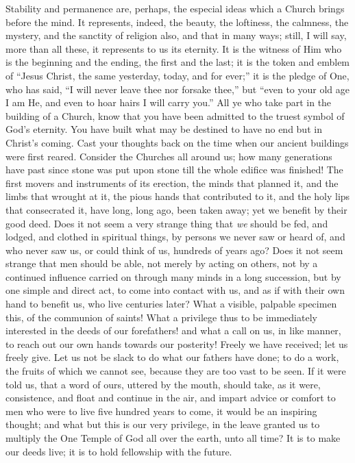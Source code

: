 Stability and permanence are, perhaps, the especial ideas which a
Church brings before the mind. It represents, indeed, the beauty, the
loftiness, the calmness, the mystery, and the sanctity of religion
also, and that in many ways; still, I will say, more than all these,
it represents to us its eternity. It is the witness of Him who is the
beginning and the ending, the first and the last; it is the token and
emblem of ``Jesus Christ, the same yesterday, today, and for
ever;'' it is the pledge of One, who has said, ``I will never
leave thee nor forsake thee,'' but ``even to your old age I am
He, and even to hoar hairs I will carry you.'' All ye who take
part in the building of a Church, know that you have been admitted to
the truest symbol of God's eternity. You have built what may be
destined to have no end but in Christ's coming. Cast your thoughts
back on the time when our ancient buildings were first reared.
Consider the Churches all around us; how many generations have past
since stone was put upon stone till the whole edifice was finished!
The first movers and instruments of its erection, the minds that
planned it, and the limbs that wrought at it, the pious hands that
contributed to it, and the holy lips that consecrated it, have long,
long ago, been taken away; yet we benefit by their good deed. Does it
not seem a very strange thing that \emph{we} should be fed, and
lodged, and clothed in spiritual things, by persons we never saw or
heard of, and who never saw us, or could think of us, hundreds of
years ago? Does it not seem strange that men should be able, not
merely by acting on others, not by a continued influence carried on
through many minds in a long succession, but by one simple and direct
act, to come into contact with us, and as if with their own hand to
benefit us, who live centuries later? What a visible, palpable
specimen this, of the communion of saints! What a privilege thus to be
immediately interested in the deeds of our forefathers! and what a
call on us, in like manner, to reach out our own hands towards our
posterity! Freely we have received; let us freely give. Let us not be
slack to do what our fathers have done; to do a work, the fruits of
which we cannot see, because they are too vast to be seen. If it were
told us, that a word of ours, uttered by the mouth, should take, as it
were, consistence, and float and continue in the air, and impart
advice or comfort to men who were to live five hundred years to come,
it would be an inspiring thought; and what but this is our very
privilege, in the leave granted us to multiply the One Temple of God
all over the earth, unto all time? It is to make our deeds live; it is
to hold fellowship with the future.

